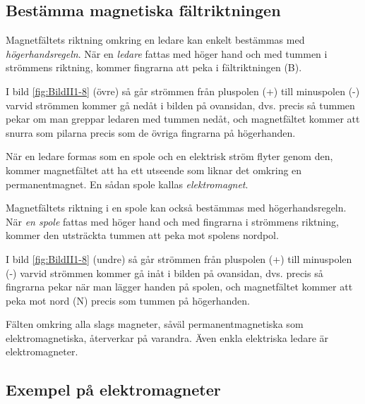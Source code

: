 \subsection{Bestämma magnetiska fältriktningen}

Magnetfältets riktning omkring en ledare kan enkelt bestämmas med
\emph{högerhandsregeln}.
När en \emph{ledare} fattas med höger hand och med tummen i strömmens
riktning, kommer fingrarna att peka i fältriktningen (B).

I bild \ref{fig:BildII1-8} (övre) så går strömmen från pluspolen (+) till
minuspolen (-) varvid strömmen kommer gå nedåt i bilden på ovansidan,
dvs. precis så tummen pekar om man greppar ledaren med tummen nedåt, och
magnetfältet kommer att snurra som pilarna precis som de övriga fingrarna på
högerhanden.

När en ledare formas som en spole och en elektrisk ström flyter genom den,
kommer magnetfältet att ha ett utseende som liknar det omkring en
permanentmagnet.
En sådan spole kallas \emph{elektromagnet}.

Magnetfältets riktning i en spole kan också bestämmas med högerhandsregeln.
När \emph{en spole} fattas med höger hand och med fingrarna i strömmens
riktning, kommer den utsträckta tummen att peka mot spolens nordpol.

I bild \ref{fig:BildII1-8} (undre) så går strömmen från pluspolen (+) till
minuspolen (-) varvid strömmen kommer gå inåt i bilden på ovansidan, dvs.
precis så fingrarna pekar när man lägger handen på spolen, och magnetfältet
kommer att peka mot nord (N) precis som tummen på högerhanden.

Fälten omkring alla slags magneter, såväl permanentmagnetiska som
elektromagnetiska, återverkar på varandra.
Även enkla elektriska ledare är elektromagneter.

\clearpage

\subsection{Exempel på elektromagneter}

